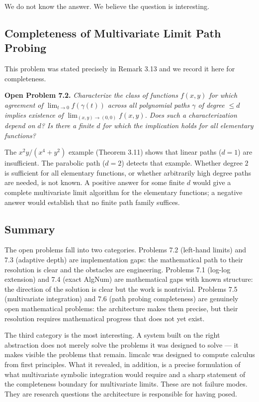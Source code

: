 \documentclass[12pt]{article}
\begin{document}
We do not know the answer. We believe the question is interesting.




\subsection{Completeness of Multivariate Limit Path
Probing}\label{completeness-of-multivariate-limit-path-probing}

This problem was stated precisely in Remark 3.13 and we record it here
for completeness.

\textbf{Open Problem 7.2.} \emph{Characterize the class of functions
\(f(x,y)\) for which agreement of \(\lim_{t\to 0} f(\gamma(t))\) across
all polynomial paths \(\gamma\) of degree \(\leq d\) implies existence
of \(\lim_{(x,y)\to(0,0)} f(x,y)\). Does such a characterization depend
on \(d\)? Is there a finite \(d\) for which the implication holds for
all elementary functions?}

The \(x^2y/(x^4+y^2)\) example (Theorem 3.11) shows that linear paths
(\(d=1\)) are insufficient. The parabolic path (\(d=2\)) detects that
example. Whether degree \(2\) is sufficient for all elementary
functions, or whether arbitrarily high degree paths are needed, is not
known. A positive answer for some finite \(d\) would give a complete
multivariate limit algorithm for the elementary functions; a negative
answer would establish that no finite path family suffices.




\subsection{Summary}\label{summary}

The open problems fall into two categories. Problems 7.2 (left-hand
limits) and 7.3 (adaptive depth) are implementation gaps: the
mathematical path to their resolution is clear and the obstacles are
engineering. Problems 7.1 (log-log extension) and 7.4 (exact AlgNum) are
mathematical gaps with known structure: the direction of the solution is
clear but the work is nontrivial. Problems 7.5 (multivariate
integration) and 7.6 (path probing completeness) are genuinely open
mathematical problems: the architecture makes them precise, but their
resolution requires mathematical progress that does not yet exist.

The third category is the most interesting. A system built on the right
abstraction does not merely solve the problems it was designed to solve
--- it makes visible the problems that remain. limcalc was designed to
compute calculus from first principles. What it revealed, in addition,
is a precise formulation of what multivariate symbolic integration would
require and a sharp statement of the completeness boundary for
multivariate limits. These are not failure modes. They are research
questions the architecture is responsible for having posed.
\end{document}
